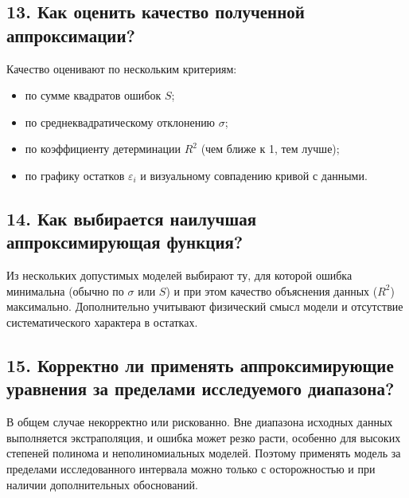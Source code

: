 \documentclass[a4paper,12pt]{article}
\begin{document}
\subsection*{13. Как оценить качество полученной аппроксимации?}

Качество оценивают по нескольким критериям:
\begin{itemize}
	\item по сумме квадратов ошибок $S$;
	\item по среднеквадратическому отклонению $\sigma$;
	\item по коэффициенту детерминации $R^2$ (чем ближе к 1, тем лучше);
	\item по графику остатков $\varepsilon_i$ и визуальному совпадению кривой с данными.
\end{itemize}

\subsection*{14. Как выбирается наилучшая аппроксимирующая функция?}

Из нескольких допустимых моделей выбирают ту, для которой ошибка минимальна (обычно по $\sigma$ или $S$) и при этом качество объяснения данных ($R^2$) максимально. Дополнительно учитывают физический смысл модели и отсутствие систематического характера в остатках.

\subsection*{15. Корректно ли применять аппроксимирующие уравнения за пределами исследуемого диапазона?}

В общем случае некорректно или рискованно. Вне диапазона исходных данных выполняется экстраполяция, и ошибка может резко расти, особенно для высоких степеней полинома и неполиномиальных моделей. Поэтому применять модель за пределами исследованного интервала можно только с осторожностью и при наличии дополнительных обоснований.
\end{document}

